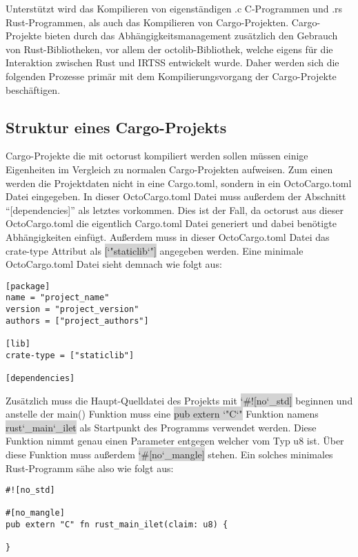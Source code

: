 Unterstützt wird das Kompilieren von eigenständigen .c C-Programmen und .rs Rust-Programmen, als auch das Kompilieren von
Cargo-Projekten. Cargo-Projekte bieten durch das Abhängigkeitsmanagement zusätzlich den Gebrauch von Rust-Bibliotheken, vor
allem der octolib-Bibliothek, welche eigens für die Interaktion zwischen Rust und IRTSS entwickelt wurde. Daher werden sich die
folgenden Prozesse primär mit dem Kompilierungsvorgang der Cargo-Projekte beschäftigen.

\subsection{Struktur eines Cargo-Projekts}

Cargo-Projekte die mit octorust kompiliert werden sollen müssen einige Eigenheiten im Vergleich zu normalen Cargo-Projekten aufweisen.
Zum einen werden die Projektdaten nicht in eine Cargo.toml, sondern in ein OctoCargo.toml Datei eingegeben. In dieser OctoCargo.toml
Datei muss außerdem der Abschnitt ``[dependencies]'' als letztes vorkommen. 
Dies ist der Fall, da octorust aus dieser OctoCargo.toml die eigentlich Cargo.toml Datei generiert
und dabei benötigte Abhängigkeiten einfügt. Außerdem muss in dieser OctoCargo.toml Datei das crate-type Attribut als
\colorbox{lightgray}{[\char`"staticlib\char`"]} angegeben werden. Eine minimale OctoCargo.toml Datei sieht demnach wie folgt aus:
\begin{verbatim}
[package]
name = "project_name"
version = "project_version"
authors = ["project_authors"]

[lib]
crate-type = ["staticlib"]

[dependencies]
\end{verbatim}


Zusätzlich muss die Haupt-Quelldatei des Projekts mit \colorbox{lightgray}{\char`#![no\char`_std]} beginnen und anstelle der main()
Funktion muss eine \colorbox{lightgray}{pub extern \char`"C\char`"} Funktion namens
\colorbox{lightgray}{rust\char`_main\char`_ilet} als Startpunkt des Programms verwendet werden. Diese Funktion nimmt genau einen 
Parameter entgegen welcher vom Typ u8 ist. Über diese  Funktion muss außerdem \colorbox{lightgray}{\char`#[no\char`_mangle]} stehen.
Ein solches minimales Rust-Programm sähe also wie folgt aus:
\begin{verbatim}
#![no_std]

#[no_mangle]
pub extern "C" fn rust_main_ilet(claim: u8) {

}
\end{verbatim}

